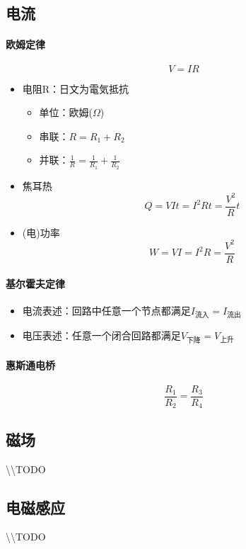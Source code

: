 \subsection{电流}

\paragraph{欧姆定律}
\begin{equation*}
    V=IR
\end{equation*}
\begin{itemize}
    \item 电阻R：日文为電気抵抗
    \begin{itemize}
        \item 单位：欧姆($\Omega$)
        \item 串联：$R=R_1+R_2$
        \item 并联：$\frac{1}{R}=\frac{1}{R_1}+\frac{1}{R_2}$
    \end{itemize}
    \item 焦耳热
    \begin{equation*}
        Q=VIt=I^2Rt=\frac{V^2}{R}t
    \end{equation*}
    \item (电)功率
    \begin{equation*}
        W=VI=I^2R=\frac{V^2}{R}
    \end{equation*}
\end{itemize}

\paragraph{基尔霍夫定律}
\begin{itemize}
    \item 电流表述：回路中任意一个节点都满足$I_\textrm{流入}=I_\textrm{流出}$
    \item 电压表述：任意一个闭合回路都满足$V_\textrm{下降}=V_\textrm{上升}$
\end{itemize}

\paragraph{惠斯通电桥}
\begin{equation*}
    \frac{R_1}{R_2}=\frac{R_3}{R_4}
\end{equation*}

\subsection{磁场}

\textbackslash\textbackslash TODO

\subsection{电磁感应}

\textbackslash\textbackslash TODO
